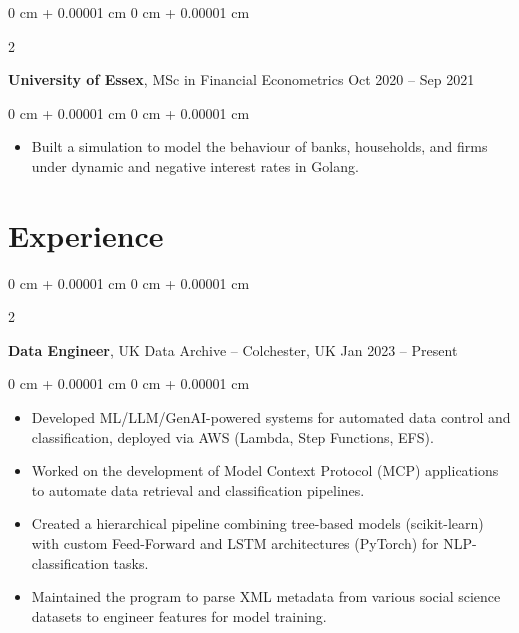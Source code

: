 \documentclass[10pt, letterpaper]{article}
\newenvironment{highlights}{
    \begin{itemize}[
        topsep=0.10 cm,
        parsep=0.10 cm,
        partopsep=0pt,
        itemsep=0pt,
        leftmargin=0 cm + 10pt
    ]
}{
    \end{itemize}
} %
\newenvironment{onecolentry}{
    \begin{adjustwidth}{
        0 cm + 0.00001 cm
    }{
        0 cm + 0.00001 cm
    }
}{
    \end{adjustwidth}
} %
\newenvironment{twocolentry}[2][]{
    \onecolentry
    \def\secondColumn{#2}
    \setcolumnwidth{\fill, 4.5 cm}
    \begin{paracol}{2}
}{
    \switchcolumn \raggedleft \secondColumn
    \end{paracol}
    \endonecolentry
} %
\begin{document}
    
        \begin{twocolentry}{
            Oct 2020 – Sep 2021 
        }
            \textbf{University of Essex}, MSc in Financial Econometrics\end{twocolentry}

        \vspace{0.10 cm}
        \begin{onecolentry}
            \begin{highlights}
            \item Built a simulation to model the behaviour of banks, households, and firms under dynamic and negative interest rates in Golang.
            \end{highlights}
        \end{onecolentry}

    \section{Experience}

        
        \begin{twocolentry}{
            Jan 2023  – Present
        }
            \textbf{Data Engineer}, UK Data Archive -- Colchester, UK\end{twocolentry}

        \vspace{0.10 cm}
        \begin{onecolentry}
            \begin{highlights}
              \item Developed ML/LLM/GenAI-powered systems for automated data control and classification, deployed via AWS (Lambda, Step Functions, EFS).
              \item Worked on the development of Model Context Protocol (MCP) applications to automate data retrieval and classification pipelines.
              \item Created a hierarchical pipeline combining tree-based models (scikit-learn) with custom Feed-Forward and LSTM architectures (PyTorch) for NLP-classification tasks.
              \item Maintained the program to parse XML metadata from various social science datasets to engineer features for model training.
            \end{highlights}
        \end{onecolentry}


        \vspace{0.2 cm}
\end{document}
